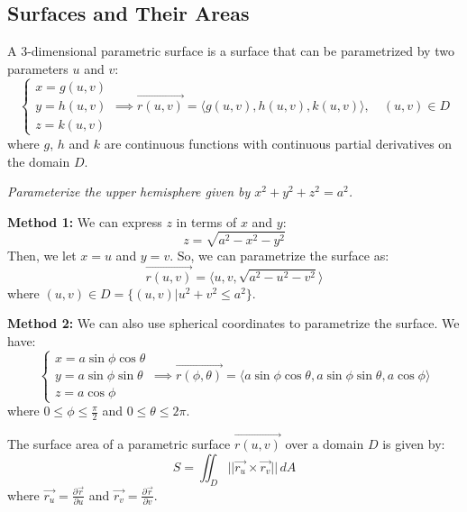 \documentclass[11pt]{report}
\begin{document}
\subsection{Surfaces and Their Areas}
\begin{definition}
    A 3-dimensional parametric surface is a surface that can be parametrized by two parameters \(u\) and \(v\):
    \begin{equation}
        \begin{cases}
            x = g(u,v) \\
            y = h(u,v) \\
            z = k(u,v)
        \end{cases} \implies \vec{r(u,v)} = \langle g(u,v), h(u,v), k(u,v) \rangle, \quad (u,v) \in D
    \end{equation}
    where \(g\), \(h\) and \(k\) are continuous functions with continuous partial derivatives on the domain \(D\).
\end{definition}

\begin{example}
    \textit{Parameterize the upper hemisphere given by \(x^2 + y^2 + z^2 = a^2\).}

    \textbf{Method 1:} We can express \(z\) in terms of \(x\) and \(y\):
    $$    
        z = \sqrt{a^2 - x^2 - y^2}
    $$
    Then, we let $x = u$ and $y = v$. So, we can parametrize the surface as:
    $$    
        \vec{r(u,v)} = \langle u, v, \sqrt{a^2 - u^2 - v^2} \rangle
    $$
    where \((u,v) \in D = \{(u,v) | u^2 + v^2 \leq a^2\}\).

    \textbf{Method 2:} We can also use spherical coordinates to parametrize the surface. We have:
    $$    
        \begin{cases}
            x = a \sin \phi \cos \theta \\
            y = a \sin \phi \sin \theta \\
            z = a \cos \phi
        \end{cases} \implies \vec{r(\phi, \theta)} = \langle a \sin \phi \cos \theta, a \sin \phi \sin \theta, a \cos \phi \rangle
    $$
    where \(0 \leq \phi \leq \frac{\pi}{2}\) and \(0 \leq \theta \leq 2\pi\).
\end{example}


\begin{definition}
    The surface area of a parametric surface \(\vec{r(u,v)}\) over a domain \(D\) is given by:
    \begin{equation}
        S = \iint_D ||\vec{r_u} \times \vec{r_v}|| \, dA
    \end{equation}
    where \(\vec{r_u} = \frac{\partial \vec{r}}{\partial u}\) and \(\vec{r_v} = \frac{\partial \vec{r}}{\partial v}\).
\end{definition}
\end{document}
